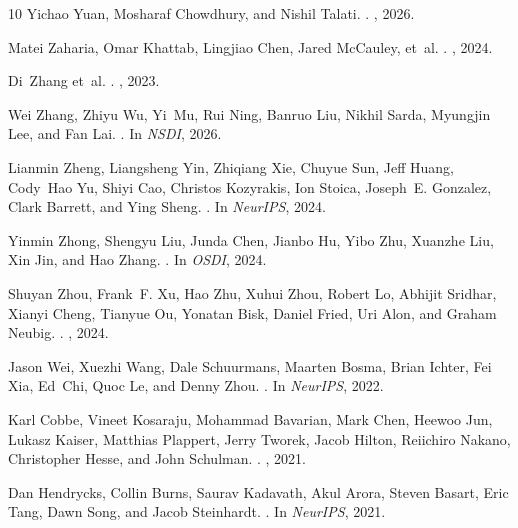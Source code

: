 \begin{thebibliography}{10}
Yichao Yuan, Mosharaf Chowdhury, and Nishil Talati.
.
, 2026.

Matei Zaharia, Omar Khattab, Lingjiao Chen, Jared McCauley, et~al.
.
, 2024.

Di~Zhang et~al.
.
, 2023.

Wei Zhang, Zhiyu Wu, Yi~Mu, Rui Ning, Banruo Liu, Nikhil Sarda, Myungjin Lee,
  and Fan Lai.
.
\newblock In {\em NSDI}, 2026.

Lianmin Zheng, Liangsheng Yin, Zhiqiang Xie, Chuyue Sun, Jeff Huang, Cody~Hao
  Yu, Shiyi Cao, Christos Kozyrakis, Ion Stoica, Joseph~E. Gonzalez, Clark
  Barrett, and Ying Sheng.
.
\newblock In {\em NeurIPS}, 2024.

Yinmin Zhong, Shengyu Liu, Junda Chen, Jianbo Hu, Yibo Zhu, Xuanzhe Liu, Xin
  Jin, and Hao Zhang.
.
\newblock In {\em OSDI}, 2024.

Shuyan Zhou, Frank~F. Xu, Hao Zhu, Xuhui Zhou, Robert Lo, Abhijit Sridhar,
  Xianyi Cheng, Tianyue Ou, Yonatan Bisk, Daniel Fried, Uri Alon, and Graham
  Neubig.
.
, 2024.

Jason Wei, Xuezhi Wang, Dale Schuurmans, Maarten Bosma, Brian Ichter, Fei Xia,
  Ed~Chi, Quoc Le, and Denny Zhou.
.
\newblock In {\em NeurIPS}, 2022.

Karl Cobbe, Vineet Kosaraju, Mohammad Bavarian, Mark Chen, Heewoo Jun, Lukasz
  Kaiser, Matthias Plappert, Jerry Tworek, Jacob Hilton, Reiichiro Nakano,
  Christopher Hesse, and John Schulman.
.
, 2021.

Dan Hendrycks, Collin Burns, Saurav Kadavath, Akul Arora, Steven Basart, Eric
  Tang, Dawn Song, and Jacob Steinhardt.
.
\newblock In {\em NeurIPS}, 2021.


\end{thebibliography}
